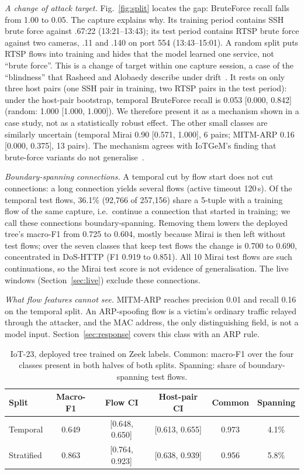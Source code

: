 \emph{A change of attack target.} Fig.~\ref{fig:split} locates the gap: BruteForce recall falls from 1.00 to 0.05. The capture explains why. Its training period contains SSH brute force against .67:22 (13:21--13:43); its test period contains RTSP brute force against two cameras, .11 and .140 on port 554 (13:43--15:01). A random split puts RTSP flows into training and hides that the model learned one service, not ``brute force''. This is a change of target within one capture session, a case of the ``blindness'' that Rasheed and Alobaedy describe under drift~\cite{rasheed2026drift}. It rests on only three host pairs (one SSH pair in training, two RTSP pairs in the test period): under the host-pair bootstrap, temporal BruteForce recall is 0.053 [0.000, 0.842] (random: 1.000 [1.000, 1.000]). We therefore present it as a mechanism shown in a case study, not as a statistically robust effect. The other small classes are similarly uncertain (temporal Mirai 0.90 [0.571, 1.000], 6 pairs; MITM-ARP 0.16 [0.000, 0.375], 13 pairs). The mechanism agrees with IoTGeM's finding that brute-force variants do not generalise~\cite{kostas2024iotgem}.

\emph{Boundary-spanning connections.} A temporal cut by flow start does not cut connections: a long connection yields several flows (active timeout 120\,s). Of the temporal test flows, 36.1\% (92,766 of 257,156) share a 5-tuple with a training flow of the same capture, i.e.\ continue a connection that started in training; we call these connections boundary-spanning. Removing them lowers the deployed tree's macro-F1 from 0.725 to 0.604, mostly because Mirai is then left without test flows; over the seven classes that keep test flows the change is 0.700 to 0.690, concentrated in DoS-HTTP (F1 0.919 to 0.851). All 10 Mirai test flows are such continuations, so the Mirai test score is not evidence of generalisation. The live windows (Section~\ref{sec:live}) exclude these connections.

\emph{What flow features cannot see.} MITM-ARP reaches precision 0.01 and recall 0.16 on the temporal split. An ARP-spoofing flow is a victim's ordinary traffic relayed through the attacker, and the MAC address, the only distinguishing field, is not a model input. Section~\ref{sec:response} covers this class with an ARP rule.

\begin{table}[t]
\centering
\caption{IoT-23, deployed tree trained on Zeek labels. Common: macro-F1 over the four classes present in both halves of both splits. Spanning: share of boundary-spanning test flows.}
\label{tab:iot23split}
\footnotesize
\setlength{\tabcolsep}{2.5pt}
\begin{tabular}{lccccc}
\hline
Split & Macro-F1 & Flow CI & Host-pair CI & Common & Spanning \\
\hline
Temporal   & 0.649 & [0.648, 0.650] & [0.613, 0.655] & 0.973 & 4.1\% \\
Stratified & 0.863 & [0.764, 0.923] & [0.638, 0.939] & 0.956 & 5.8\% \\
\hline
\end{tabular}
\end{table}

